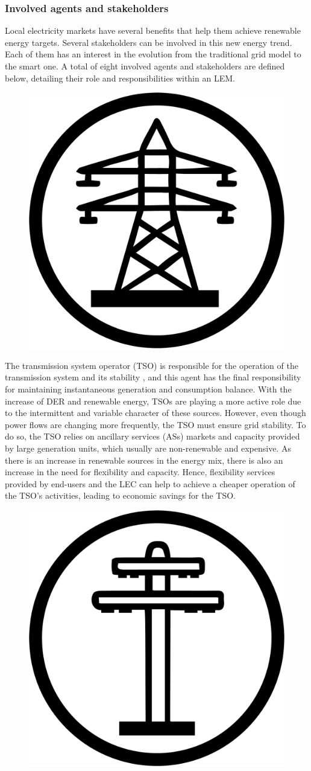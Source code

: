 \subsubsection{Involved agents and stakeholders}
Local electricity markets have several benefits that help them achieve renewable energy targets. Several stakeholders can be involved in this new energy trend. Each of them has an interest in the evolution from the traditional grid model to the smart one. A total of eight involved agents and stakeholders are defined below, detailing their role and responsibilities within an LEM. \newline


\begin{figure}
\centering
	\includegraphics[width=0.1\columnwidth ]{ChapterIntro/Figures/TSO.jpg}
\end{figure} 

The transmission system operator (TSO) is responsible for the operation of the transmission system and its stability \cite{VILLAR2018Flexibility}, and this agent has the final responsibility for maintaining instantaneous generation and consumption balance. With the increase of DER and renewable energy, TSOs are playing a more active role due to the intermittent and variable character of these sources. However, even though power flows are changing more frequently, the TSO must ensure grid stability. To do so, the TSO relies on ancillary services (ASs) markets and capacity provided by large generation units, which usually are non-renewable and expensive. As there is an increase in renewable sources in the energy mix, there is also an increase in the need for flexibility and capacity. Hence, flexibility services provided by end-users and the LEC can help to achieve a cheaper operation of the TSO's activities, leading to economic savings for the TSO.

\begin{figure}
	\centering
	\includegraphics[width=0.1\columnwidth ]{ChapterIntro/Figures/DSO.jpg}
	\label{DSO}  
\end{figure}


